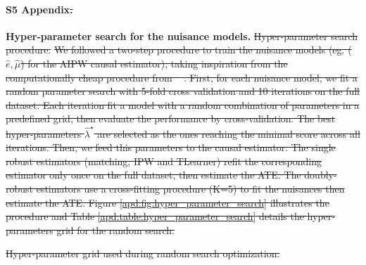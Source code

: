 \documentclass[10pt,letterpaper]{article}
\providecommand{\DIFdeltex}[1]{{\protect\color{red}\sout{#1}}}                      %
\providecommand{\DIFdelbegin}{} %
\providecommand{\DIFdelend}{} %
\providecommand{\DIFdelFL}[1]{\DIFdel{#1}} %
\providecommand{\DIFdel}[1]{\texorpdfstring{\DIFdeltex{#1}}{}} %
\newcommand{\DIFscaledelfig}{0.5}
\newlength{\DIFdelgraphicswidth} %
\newlength{\DIFdelgraphicsheight} %
\newcommand{\DIFdelincludegraphics}[2][]{%
\sbox{\DIFdelgraphicsbox}{\DIFOincludegraphics[#1]{#2}}%
\settoboxwidth{\DIFdelgraphicswidth}{\DIFdelgraphicsbox} %
\settoboxtotalheight{\DIFdelgraphicsheight}{\DIFdelgraphicsbox} %
\scalebox{\DIFscaledelfig}{%
\parbox[b]{\DIFdelgraphicswidth}{\usebox{\DIFdelgraphicsbox}\\[-\baselineskip] \rule{\DIFdelgraphicswidth}{0em}}\llap{\resizebox{\DIFdelgraphicswidth}{\DIFdelgraphicsheight}{%
\setlength{\unitlength}{\DIFdelgraphicswidth}%
\begin{picture}(1,1)%
\thicklines\linethickness{2pt} %
{\color[rgb]{1,0,0}\put(0,0){\framebox(1,1){}}}%
{\color[rgb]{1,0,0}\put(0,0){\line( 1,1){1}}}%
{\color[rgb]{1,0,0}\put(0,1){\line(1,-1){1}}}%
\end{picture}%
}\hspace*{3pt}}} %
} %
\DeclareRobustCommand{\DIFdelbegin}{\DIFOdelbegin \let\includegraphics\DIFdelincludegraphics} %
\DeclareRobustCommand{\DIFdelend}{\DIFOaddend \let\includegraphics\DIFOincludegraphics} %
\begin{document}
\paragraph*{S5 Appendix\DIFdelbegin \DIFdel{.}\DIFdelend }
\label{apd:hyper_parameter_search}
{\bf Hyper-parameter search for the nuisance models.}
\DIFdelbegin %
{%
  \DIFdelFL{Hyper-parameter search procedure.}}%
\DIFdel{We followed a two-step procedure to train the nuisance models (eg. ($\hat e,
    \hat \mu$) for the AIPW causal estimator), taking inspiration from the
  computationally cheap procedure from
  \mbox{%
    \cite[section~3.3]{bouthillier2021accounting}}\hskip0pt%
  . First, for each nuisance
  model, we fit a random parameter search with 5-fold cross validation and 10
  iterations on the full dataset. Each iteration fit a model with a random
  combination of parameters in a predefined grid, then evaluate the
  performance by cross-validation. The best hyper-parameters $\hat
    \lambda^{\star}$ are selected as the ones reaching the minimal score across
  all iterations. Then, we feed this parameters to the causal estimator. The
  single robust estimators (matching, IPW and TLearner) refit the
  corresponding estimator only once on the full dataset, then estimate the
  ATE. The doubly-robust estimators use a cross-fitting procedure (K=5) to fit
  the nuisances then estimate the ATE. Figure
  \ref{apd:fig:hyper_parameter_search} illustrates the procedure and Table
  \ref{apd:table:hyper_parameter_search} details the hyper-parameters grid for
  the random search.
}%

{%
  \DIFdelFL{Hyper-parameter grid used during random search
    optimization.}}%
\end{document}
